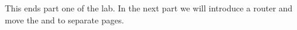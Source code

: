 \documentclass[fleqn, article, a4paper]{memoir}
\begin{document}
\begin{Assignments}
\item This ends part one of the lab. In the next part we will introduce a router and move the  and  to separate pages.

\end{Assignments}


\end{document}
